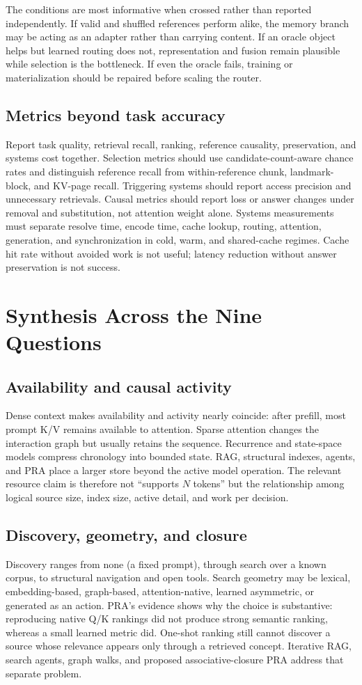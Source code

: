 \documentclass[10pt,a4paper]{article}
\begin{document}
The conditions are most informative when crossed rather than reported independently.
If valid and shuffled references perform alike, the memory branch may be acting as an
adapter rather than carrying content.  If an oracle object helps but learned routing does
not, representation and fusion remain plausible while selection is the bottleneck.  If
even the oracle fails, training or materialization should be repaired before scaling the
router.

\subsection{Metrics beyond task accuracy}
Report task quality, retrieval recall, ranking, reference causality, preservation, and
systems cost together.  Selection metrics should use candidate-count-aware chance rates
and distinguish reference recall from within-reference chunk, landmark-block, and KV-page
recall. Triggering systems should report access precision and unnecessary retrievals.
Causal metrics
should report loss or answer changes under removal and substitution, not attention weight
alone.  Systems measurements must separate resolve time, encode time, cache lookup,
routing, attention, generation, and synchronization in cold, warm, and shared-cache
regimes.  Cache hit rate without avoided work is not useful; latency reduction without
answer preservation is not success.

\section{Synthesis Across the Nine Questions}

\subsection{Availability and causal activity}
Dense context makes availability and activity nearly coincide: after prefill, most prompt K/V
remains available to attention. Sparse attention changes the interaction graph but usually
retains the sequence. Recurrence and state-space models compress chronology into bounded
state. RAG, structural indexes, agents, and PRA place a larger store beyond the active model
operation. The relevant resource claim is therefore not ``supports $N$ tokens'' but the
relationship among logical source size, index size, active detail, and work per decision.

\subsection{Discovery, geometry, and closure}
Discovery ranges from none (a fixed prompt), through search over a known corpus, to structural
navigation and open tools. Search geometry may be lexical, embedding-based, graph-based,
attention-native, learned asymmetric, or generated as an action. PRA's evidence shows why the
choice is substantive: reproducing native Q/K rankings did not produce strong semantic
ranking, whereas a small learned metric did. One-shot ranking still cannot discover a source
whose relevance appears only through a retrieved concept. Iterative RAG, search agents, graph
walks, and proposed associative-closure PRA address that separate problem.
\end{document}
